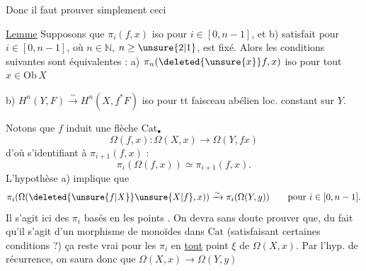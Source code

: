 Donc il faut prouver simplement ceci

\uline{Lemme} Supposons que $\pi_i(f,x)$ iso pour $i\in[0,n-1]$, et b) satisfait pour $i\in[0,n-1]$, où $n\in\mathbb N$, $n\geq\unsure{2|1}$, est fixé. Alors les conditions suivantes sont équivalentes :
a) $\pi_n(\deleted{\unsure{x}}f,x)$  iso pour tout $x\in\mathrm{Ob}\,X$

b) $H^n(Y,F)\xrightarrow{\sim}H^n(X,f^*F)$ iso pour tt faisceau abélien loc. constant sur $Y$.

Notons que  $f$ induit une flèche  $\mathrm{Cat}_{\bullet}$
\[
\Omega(f,x):\Omega(X,x)\longrightarrow\Omega(Y,fx)
\]
d'où
s'identifiant à $\pi_{i+1}(f,x)$ :
\[
\pi_i(\Omega(f,x))\simeq\pi_{i+1}(f,x).
\]
L'hypothèse  a)  implique que
\[
\pi_i(\Omega(\deleted{\unsure{f|X}}\unsure{X|f},x))\xrightarrow{\sim}\pi_i(\Omega(Y,y))\qquad\text{pour }i\in[0,n-1].
\]
Il s'agit ici des $\pi_i$ basés en les points . On devra sans doute prouver que, du fait qu'il s'agit d'un morphisme de monoïdes dans $\mathrm{Cat}$ (satisfaisant certaines conditions ?) ça reste vrai pour les $\pi_i$ en \uline{tout} point $\xi$ de $\Omega(X,x)$. Par l'hyp. de récurrence, on saura donc que $\Omega(X,x)\to\Omega(Y,y)$
